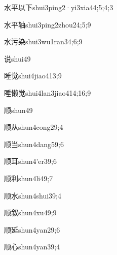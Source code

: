 \begin{verbete}{水平以下}{shui3ping2·yi3xia4}{4;5;4;3}
\end{verbete}
\begin{verbete}{水平轴}{shui3ping2zhou2}{4;5;9}
\end{verbete}
\begin{verbete}{水污染}{shui3wu1ran3}{4;6;9}
\end{verbete}
\begin{verbete}{说}{shui4}{9}
\end{verbete}
\begin{verbete}{睡觉}{shui4jiao4}{13;9}
\end{verbete}
\begin{verbete}{睡懒觉}{shui4lan3jiao4}{14;16;9}
\end{verbete}
\begin{verbete}{顺}{shun4}{9}
\end{verbete}
\begin{verbete}{顺从}{shun4cong2}{9;4}
\end{verbete}
\begin{verbete}{顺当}{shun4dang5}{9;6}
\end{verbete}
\begin{verbete}{顺耳}{shun4'er3}{9;6}
\end{verbete}
\begin{verbete}{顺利}{shun4li4}{9;7}
\end{verbete}
\begin{verbete}{顺水}{shun4shui3}{9;4}
\end{verbete}
\begin{verbete}{顺叙}{shun4xu4}{9;9}
\end{verbete}
\begin{verbete}{顺延}{shun4yan2}{9;6}
\end{verbete}
\begin{verbete}{顺心}{shun4yan3}{9;4}
\end{verbete}

